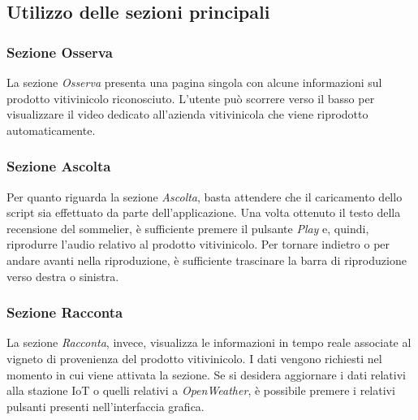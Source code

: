 \subsection{Utilizzo delle sezioni principali}

\subsubsection{Sezione Osserva}

La sezione \textit{Osserva} presenta una pagina singola con alcune informazioni sul prodotto vitivinicolo riconosciuto. L'utente può scorrere verso il basso per visualizzare il video dedicato all'azienda vitivinicola che viene riprodotto automaticamente.

\subsubsection{Sezione Ascolta}

Per quanto riguarda la sezione \textit{Ascolta}, basta attendere che il caricamento dello script sia effettuato da parte dell'applicazione. Una volta ottenuto il testo della recensione del sommelier, è sufficiente premere il pulsante \textit{Play} e, quindi, riprodurre l'audio relativo al prodotto vitivinicolo. Per tornare indietro o per andare avanti nella riproduzione, è sufficiente trascinare la barra di riproduzione verso destra o sinistra.

\subsubsection{Sezione Racconta}

La sezione \textit{Racconta}, invece, visualizza le informazioni in tempo reale associate al vigneto di provenienza del prodotto vitivinicolo. I dati vengono richiesti nel momento in cui viene attivata la sezione. Se si desidera aggiornare i dati relativi alla stazione IoT o quelli relativi a \textit{OpenWeather}, è possibile premere i relativi pulsanti presenti nell'interfaccia grafica.
